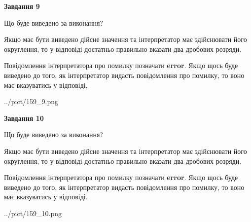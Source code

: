 \documentclass[12pt, ukrainian]{article}
\begin{document}
{\begin {Large}
{\begin {center}\textbf{Завдання 9}\end {center}}\par
Що буде виведено за виконання? \par

Якщо має бути виведено дійсне значення та інтерпретатор має здійснювати його округлення, 
то у відповіді достатньо правильно вказати два дробових розряди.

Повідомлення інтерпретатора про помилку позначати \textbf{error}.
Якщо щось буде виведено до того, як інтерпретатор видасть повідомлення про помилку, 
то воно має вказуватись у відповіді. \par

\begin{center}
	{../pict/159_9.png}
\end{center}
\newpage

{\begin {center}\textbf{Завдання 10}\end {center}}\par
Що буде виведено за виконання? \par

Якщо має бути виведено дійсне значення та інтерпретатор має здійснювати його округлення, 
то у відповіді достатньо правильно вказати два дробових розряди.

Повідомлення інтерпретатора про помилку позначати \textbf{error}.
Якщо щось буде виведено до того, як інтерпретатор видасть повідомлення про помилку, 
то воно має вказуватись у відповіді. \par

\begin{center}
	{../pict/159_10.png}
\end{center}
\newpage

\end {Large}}
\end{document}
